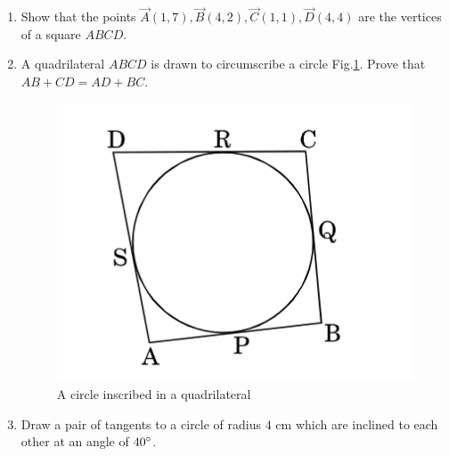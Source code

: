 \documentclass{article}
\begin{document}
\begin{enumerate}
		
			


\item Show that the points $\vec{A}(1,7), \vec{B}(4,2), \vec{C}(1,1), \vec{D}(4,4)$ are the vertices of a square $ABCD$. 

\item A quadrilateral $ABCD$ is drawn to circumscribe a circle Fig.\ref{fig:2}. Prove that $ AB + CD = AD + BC. $
	\begin{figure}[h]
	\centering
	\includegraphics[width=\columnwidth]{figs/2.jpg}
	\caption{A circle inscribed in a quadrilateral}
	\label{fig:2}
	\end{figure}

\item Draw a pair of tangents to a circle of radius $4$ cm which are inclined to each other at an angle of $40\degree$. 


\end{enumerate}
\end{document}

